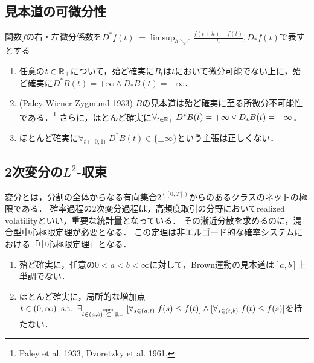 \documentclass[uplatex,dvipdfmx]{jsreport}
\begin{document}
\subsection{見本道の可微分性}


\begin{proposition}
    関数$f$の右・左微分係数を$D^*f(t):=\limsup_{h\searrow0}\frac{f(t+h)-f(t)}{h},D_*f(t)$で表すとする
    \begin{enumerate}
        \item 任意の$t\in\mathbb{R}_+$について，殆ど確実に$B_t$は$t$において微分可能でない上に，殆ど確実に$D^*B(t)=+\infty\land D_*B(t)=-\infty$．
        \item (Paley-Wiener-Zygmund 1933) $B$の見本道は殆ど確実に至る所微分不可能性である．\footnote{Paley et al. 1933, Dvoretzky et al. 1961.}
        さらに，ほとんど確実に$\forall_{t\in\mathbb{R}_+}\;D^*B(t)=+\infty\lor D_*B(t)=-\infty$．
        \item ほとんど確実に$\forall_{t\in[0,1)}\;D^*B(t)\in\{\pm\infty\}$という主張は正しくない．
    \end{enumerate}
\end{proposition}

\subsection{2次変分の$L^2$-収束}

\begin{tcolorbox}[colframe=ForestGreen, colback=ForestGreen!10!white,breakable,colbacktitle=ForestGreen!40!white,coltitle=black,fonttitle=\bfseries\sffamily,
title=]
    変分とは，分割の全体からなる有向集合$2^{([0,T])}$からのあるクラスのネットの極限である．
    確率過程の2次変分過程は，高頻度取引の分野においてrealized volatilityといい，重要な統計量となっている．
    その漸近分散を求めるのに，混合型中心極限定理が必要となる．
    この定理は非エルゴード的な確率システムにおける「中心極限定理」となる．
\end{tcolorbox}

\begin{proposition}[erratic]\mbox{}
    \begin{enumerate}
        \item 殆ど確実に，任意の$0<a<b<\infty$に対して，Brown運動の見本道は$[a,b]$上単調でない．
        \item ほとんど確実に，局所的な増加点$t\in(0,\infty)\;\;\mathrm{s.t.}\;\;\exists_{t\in(a,b)\overset{\mathrm{open}}{\subset}\mathbb{R}_+}\;[\forall_{s\in(a,t)}\;f(s)\le f(t)]\land[\forall_{s\in(t,b)}\;f(t)\le f(s)]$を持たない．
    \end{enumerate}
\end{proposition}
\end{document}
